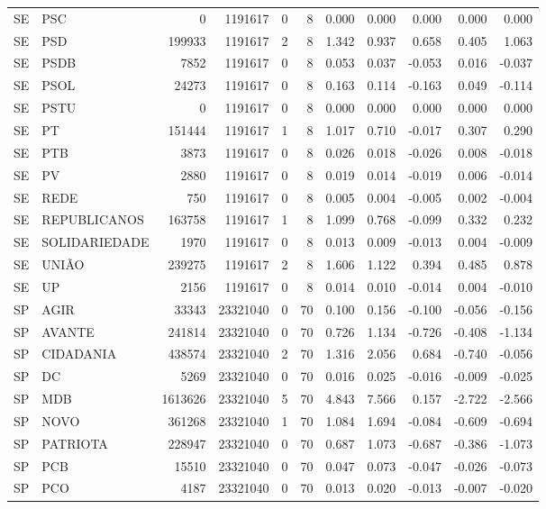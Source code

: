 \begin{landscape}
\begin{longtable}{llrrrrrrrrr}
SE & PSC & 0 & 1191617 & 0 & 8 & 0.000 & 0.000 & 0.000 & 0.000 & 0.000 \\
SE & PSD & 199933 & 1191617 & 2 & 8 & 1.342 & 0.937 & 0.658 & 0.405 & 1.063 \\
SE & PSDB & 7852 & 1191617 & 0 & 8 & 0.053 & 0.037 & -0.053 & 0.016 & -0.037 \\
SE & PSOL & 24273 & 1191617 & 0 & 8 & 0.163 & 0.114 & -0.163 & 0.049 & -0.114 \\
SE & PSTU & 0 & 1191617 & 0 & 8 & 0.000 & 0.000 & 0.000 & 0.000 & 0.000 \\
SE & PT & 151444 & 1191617 & 1 & 8 & 1.017 & 0.710 & -0.017 & 0.307 & 0.290 \\
SE & PTB & 3873 & 1191617 & 0 & 8 & 0.026 & 0.018 & -0.026 & 0.008 & -0.018 \\
SE & PV & 2880 & 1191617 & 0 & 8 & 0.019 & 0.014 & -0.019 & 0.006 & -0.014 \\
SE & REDE & 750 & 1191617 & 0 & 8 & 0.005 & 0.004 & -0.005 & 0.002 & -0.004 \\
SE & REPUBLICANOS & 163758 & 1191617 & 1 & 8 & 1.099 & 0.768 & -0.099 & 0.332 & 0.232 \\
SE & SOLIDARIEDADE & 1970 & 1191617 & 0 & 8 & 0.013 & 0.009 & -0.013 & 0.004 & -0.009 \\
SE & UNIÃO & 239275 & 1191617 & 2 & 8 & 1.606 & 1.122 & 0.394 & 0.485 & 0.878 \\
SE & UP & 2156 & 1191617 & 0 & 8 & 0.014 & 0.010 & -0.014 & 0.004 & -0.010 \\
SP & AGIR & 33343 & 23321040 & 0 & 70 & 0.100 & 0.156 & -0.100 & -0.056 & -0.156 \\
SP & AVANTE & 241814 & 23321040 & 0 & 70 & 0.726 & 1.134 & -0.726 & -0.408 & -1.134 \\
SP & CIDADANIA & 438574 & 23321040 & 2 & 70 & 1.316 & 2.056 & 0.684 & -0.740 & -0.056 \\
SP & DC & 5269 & 23321040 & 0 & 70 & 0.016 & 0.025 & -0.016 & -0.009 & -0.025 \\
SP & MDB & 1613626 & 23321040 & 5 & 70 & 4.843 & 7.566 & 0.157 & -2.722 & -2.566 \\
SP & NOVO & 361268 & 23321040 & 1 & 70 & 1.084 & 1.694 & -0.084 & -0.609 & -0.694 \\
SP & PATRIOTA & 228947 & 23321040 & 0 & 70 & 0.687 & 1.073 & -0.687 & -0.386 & -1.073 \\
SP & PCB & 15510 & 23321040 & 0 & 70 & 0.047 & 0.073 & -0.047 & -0.026 & -0.073 \\
SP & PCO & 4187 & 23321040 & 0 & 70 & 0.013 & 0.020 & -0.013 & -0.007 & -0.020 \\

\end{longtable}
\end{landscape}
